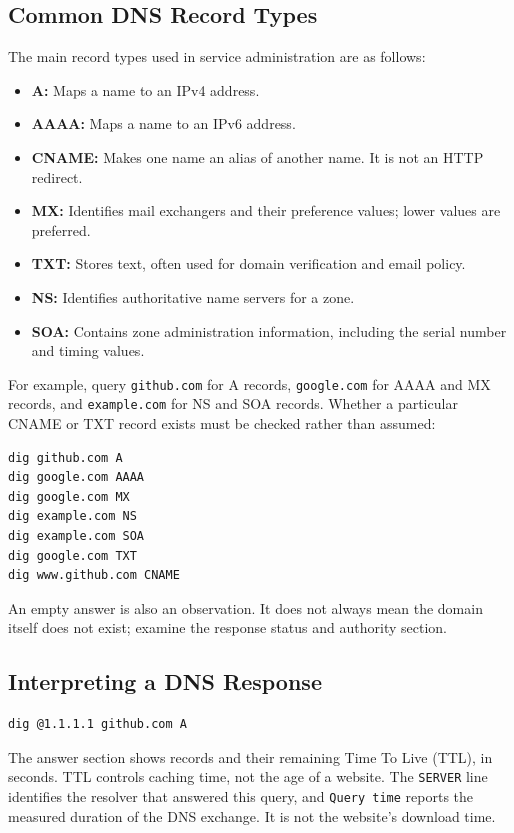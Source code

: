 \documentclass[journal]{IEEEtran}
\begin{document}
\subsection{Common DNS Record Types}
The main record types used in service administration are as follows:
\begin{itemize}
    \item \textbf{A:} Maps a name to an IPv4 address.
    \item \textbf{AAAA:} Maps a name to an IPv6 address.
    \item \textbf{CNAME:} Makes one name an alias of another name. It is not an HTTP redirect.
    \item \textbf{MX:} Identifies mail exchangers and their preference values; lower values are preferred.
    \item \textbf{TXT:} Stores text, often used for domain verification and email policy.
    \item \textbf{NS:} Identifies authoritative name servers for a zone.
    \item \textbf{SOA:} Contains zone administration information, including the serial number and timing values.
\end{itemize}
For example, query \texttt{github.com} for A records, \texttt{google.com} for AAAA and MX records, and \texttt{example.com} for NS and SOA records. Whether a particular CNAME or TXT record exists must be checked rather than assumed:
\begin{lstlisting}
dig github.com A
dig google.com AAAA
dig google.com MX
dig example.com NS
dig example.com SOA
dig google.com TXT
dig www.github.com CNAME
\end{lstlisting}
An empty answer is also an observation. It does not always mean the domain itself does not exist; examine the response status and authority section.

\subsection{Interpreting a DNS Response}
\begin{lstlisting}
dig @1.1.1.1 github.com A
\end{lstlisting}
The answer section shows records and their remaining Time To Live (TTL), in seconds. TTL controls caching time, not the age of a website. The \texttt{SERVER} line identifies the resolver that answered this query, and \texttt{Query time} reports the measured duration of the DNS exchange. It is not the website's download time.
\end{document}
